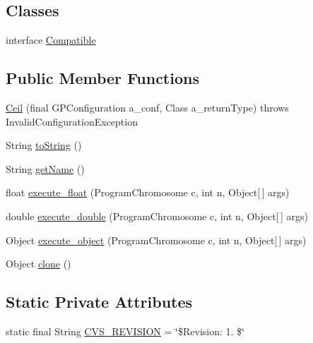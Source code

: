 \subsection*{Classes}
\begin{DoxyCompactItemize}
\item 
interface \hyperlink{interfaceorg_1_1jgap_1_1gp_1_1function_1_1_ceil_1_1_compatible}{Compatible}
\end{DoxyCompactItemize}
\subsection*{Public Member Functions}
\begin{DoxyCompactItemize}
\item 
\hyperlink{classorg_1_1jgap_1_1gp_1_1function_1_1_ceil_a958ad6a7207ccb31376c5a7bdd3109da}{Ceil} (final G\-P\-Configuration a\-\_\-conf, Class a\-\_\-return\-Type)  throws Invalid\-Configuration\-Exception 
\item 
String \hyperlink{classorg_1_1jgap_1_1gp_1_1function_1_1_ceil_a8c19aa027493c5c309925f05e8394472}{to\-String} ()
\item 
String \hyperlink{classorg_1_1jgap_1_1gp_1_1function_1_1_ceil_a07b24dcfd2b690fd36e67acbe4ba86f3}{get\-Name} ()
\item 
float \hyperlink{classorg_1_1jgap_1_1gp_1_1function_1_1_ceil_a7b9b3dbdc00a76dd51d5f9383e21a610}{execute\-\_\-float} (Program\-Chromosome c, int n, Object\mbox{[}$\,$\mbox{]} args)
\item 
double \hyperlink{classorg_1_1jgap_1_1gp_1_1function_1_1_ceil_a11bc7a180f0d3283df12180a0ffdaf5b}{execute\-\_\-double} (Program\-Chromosome c, int n, Object\mbox{[}$\,$\mbox{]} args)
\item 
Object \hyperlink{classorg_1_1jgap_1_1gp_1_1function_1_1_ceil_a5cfba9cbe95e5da1b9ee1016a6e7e135}{execute\-\_\-object} (Program\-Chromosome c, int n, Object\mbox{[}$\,$\mbox{]} args)
\item 
Object \hyperlink{classorg_1_1jgap_1_1gp_1_1function_1_1_ceil_a03d3afd5780ce34bde4c0fa3b41cc660}{clone} ()
\end{DoxyCompactItemize}
\subsection*{Static Private Attributes}
\begin{DoxyCompactItemize}
\item 
static final String \hyperlink{classorg_1_1jgap_1_1gp_1_1function_1_1_ceil_ab4560a8a7ed51cebb580fc0ce195d280}{C\-V\-S\-\_\-\-R\-E\-V\-I\-S\-I\-O\-N} = \char`\"{}\$Revision\-: 1. \$\char`\"{}
\end{DoxyCompactItemize}
